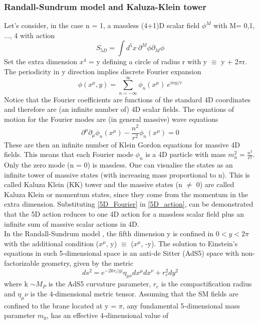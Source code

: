 \subsubsection{Randall-Sundrum model and Kaluza-Klein tower}
Let's consider, in the case n = 1, a massless (4+1)D scalar field $\phi^{M}$ with M= {0,1, ..., 4} with action
\begin{equation}
S_{5D} = \int d^5x\ \partial^M\phi \partial_M\phi
\label{5D_action}
\end{equation}
Set the extra dimension $x^4$ = y defining a circle of radius r with y $\equiv$ y + 2$\pi$r. The periodicity in y direction implies discrete Fourier expansion
\begin{equation}
\phi(x^{\mu}, y) = \sum_{n=-\infty}^\infty \phi_n(x^\mu)\ e^{iny/r}
\label{5D_Fourier}
\end{equation}
Notice that the Fourier coefficients are functions of the standard 4D coordinates and therefore are (an infinite number of) 4D scalar fields. The equations of motion for the Fourier modes are (in general massive) wave equations
\[
\partial^\mu\partial_\mu\phi_n(x^\mu)-\frac{n^2}{r^2}\phi_n(x^\mu) = 0
\]
These are then an infinite number of Klein Gordon equations for massive 4D fields. This means that each Fourier mode $\phi_n$ is a 4D particle with mass $m^2_n = \frac{n^2}{r^2}$. Only the zero mode (n = 0) is massless. One can visualise the states as an infinite tower of massive states (with increasing mass proportional to n). This is called Kaluza Klein (KK) tower and the massive states (n $\ne$ 0) are called Kaluza Klein or momentum states, since they come from the momentum in the extra dimension.
Substituting \ref{5D_Fourier} in \ref{5D_action}, can be demonstrated that the 5D action reduces to one 4D action for a massless scalar field plus an infinite sum of massive scalar actions in 4D. \\
In the Randall-Sundrum model \cite{RandallSundrum}, the fifth dimension y is confined in $0 < y <2\pi$ with the additional condition ($x^\mu$, y) $\equiv$ ($x^\mu$, -y). The solution to Einstein's equations in such 5-dimensional space is an anti-de Sitter (AdS5) space with non-factorizable geometry, given by the metric 
\[
ds^2 = e^{-2kr_c|y|}\eta_{\mu\nu}dx^\mu dx^\nu+r_c^2dy^2
\]
where k $\sim M_P$ is the AdS5 curvature parameter, $r_c$ is the compactification radius and $\eta_\mu\nu$ is the 4-dimensional metric tensor. Assuming that the SM fields are confined to the brane located at y = $\pi$, any fundamental 5-dimensional mass parameter $m_0$, has an effective 4-dimensional value of
